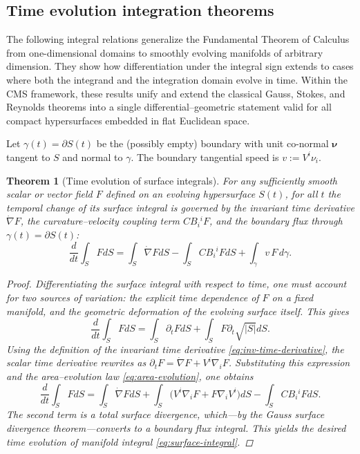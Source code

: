 \documentclass[11pt]{article}
\theoremstyle{definition}
\theoremstyle{plain}
\newtheorem{theorem}[definition]{Theorem}
\theoremstyle{remark}
\begin{document}

\subsection{Time evolution integration theorems}

The following integral relations generalize the Fundamental Theorem of Calculus from one-dimensional domains to smoothly evolving manifolds of arbitrary dimension.
They show how differentiation under the integral sign extends to cases where both the integrand and the integration domain evolve in time.
Within the CMS framework, these results unify and extend the classical Gauss, Stokes, and Reynolds theorems into a single differential–geometric statement valid for all compact hypersurfaces embedded in flat Euclidean space.

Let $\gamma(t)=\partial S(t)$ be the (possibly empty) boundary with unit co-normal $\boldsymbol{\nu}$ tangent to $S$ and normal to $\gamma$.
The boundary tangential speed is $v:=V^i\nu_i$.

\begin{theorem}[Time evolution of surface integrals]\label{thm:surface-integral}
For any sufficiently smooth scalar or vector field $F$ defined on an evolving hypersurface $S(t)$, for all $t$ the temporal change of its surface integral is governed by the invariant time derivative $\dot{\nabla}F$, the curvature–velocity coupling term $C B_i{}^{i} F$, and the boundary flux through $\gamma(t)=\partial S(t)$:
\begin{equation}
\label{eq:surface-integral}
\frac{d}{dt}\int_{S} F dS
=\int_{S}\dot{\nabla}F dS - \int_{S} C B_i{}^{i} F dS + \int_{\gamma} v\,F\,d\gamma.
\end{equation}

\begin{proof}
Differentiating the surface integral with respect to time, one must account for two sources of variation: 
the explicit time dependence of $F$ on a fixed manifold, and the geometric deformation of the evolving surface itself.  
This gives
\[
\frac{d}{dt}\int_{S}F dS
=\int_{S}\partial_t F dS+\int_{S}F \partial_t\sqrt{|S|} dS.
\]
Using the definition of the invariant time derivative \eqref{eq:inv-time-derivative}, 
the scalar time derivative rewrites as $\partial_t F=\dot{\nabla}F+V^i\nabla_i F$.  
Substituting this expression and the area–evolution law \eqref{eq:area-evolution}, one obtains
\[
\frac{d}{dt}\int_{S}F dS
=\int_{S}\dot{\nabla}F dS
+\int_{S}\bigl(V^i\nabla_i F+F \nabla_i V^i\bigr)dS
-\int_{S} C B_i{}^{i}F dS.
\]
The second term is a total surface divergence, which—by the Gauss surface divergence theorem—converts to a boundary flux integral.  
This yields the desired time evolution of manifold integral \eqref{eq:surface-integral}.
\end{proof}
\end{theorem}
\end{document}
